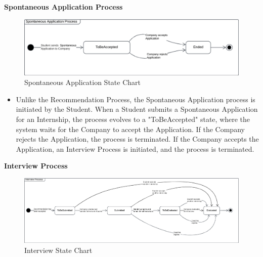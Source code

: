 \noindent\textbf{\color{titleColor}Spontaneous Application Process}\\
\begin{figure}[ht]
    \centering
    \includegraphics[width=1 \textwidth]{Latex/Images/RASD/StateCharts/SpontaneousApplicationStateChart.png}
    \caption{Spontaneous Application State Chart}
    \label{fig:SpontaneousApplication}
\end{figure}
\begin{itemize}
    \item Unlike the Recommendation Process, the Spontaneous Application process is initiated by the Student. When a Student submits a Spontaneous Application for an Internship, the process evolves to a "ToBeAccepted" state, where the system waits for the Company to accept the Application. If the Company rejects the Application, the process is terminated. If the Company accepts the Application, an Interview Process is initiated, and the process is terminated.
\end{itemize} 
\clearpage
\noindent\textbf{\color{titleColor}Interview Process}\\
\begin{figure}[H]
    \centering
    \includegraphics[width=1 \textwidth]{Latex/Images/RASD/StateCharts/InterviewProcessStateChart.png}
    \caption{Interview State Chart}
    \label{fig:InterviewProcess}
\end{figure}
